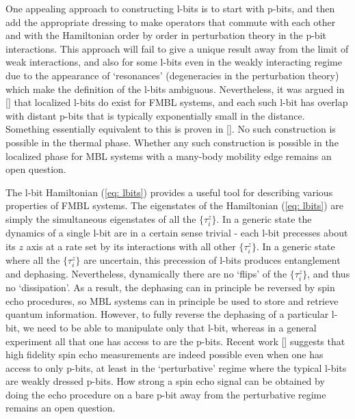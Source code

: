 \documentclass[amsmath,onecolumn, superscriptaddress,preprint,aps]{revtex4}
\renewcommand{\cite}[1]{[\onlinecite{#1}]}
\begin{document}
 One appealing approach to constructing l-bits is to start with p-bits, and then add the appropriate dressing to make operators that commute with each other and
 with the Hamiltonian order by order in perturbation theory in the p-bit interactions.  This approach will fail to give a unique result away from the limit of weak interactions,
 and also for some l-bits even in the weakly interacting regime due to the appearance of `resonances' (degeneracies in the perturbation theory)
 which make the definition of the l-bits ambiguous. Nevertheless, it was argued in \cite{Lbits, Abanin1, Abanin2, Lbits2} that localized l-bits do exist for FMBL systems, and each such l-bit has overlap with distant p-bits that is typically exponentially
 small in the distance.  Something essentially equivalent to this is proven in \cite{IS}.
 No such construction is possible in the thermal phase.  Whether any such construction is possible in the localized phase for MBL systems with a many-body mobility edge
 remains an open question.

    The l-bit Hamiltonian (\ref{eq: lbits}) provides a useful tool for describing various properties of FMBL systems.  The eigenstates of the Hamiltonian (\ref{eq: lbits}) are simply the simultaneous eigenstates of all the $\{\tau^z_i\}$.  In a generic state the dynamics of a single l-bit are in a certain sense trivial - each l-bit precesses about its $z$ axis at a rate set by its interactions with all other $\{\tau^z_i\}$.  In a generic state where all the $\{\tau^z_i\}$ are uncertain, this precession of l-bits produces entanglement and dephasing.
    Nevertheless, dynamically there are no `flips' of the $\{\tau^z_i\}$, and thus no `dissipation'.  As a result, the dephasing can in principle be reversed by spin echo procedures, so MBL systems can in principle be used to store and retrieve quantum information.  However, to fully reverse the dephasing of a particular l-bit, we need to be able to manipulate only that l-bit, whereas in a general experiment all that one has access to are the p-bits.  Recent work \cite{Serbynetal} suggests that high fidelity spin echo measurements are indeed possible even when one has access to only p-bits, at least in the `perturbative' regime where the typical l-bits are weakly dressed p-bits.  How strong a spin echo signal can be obtained by doing the echo procedure on a bare p-bit away from the perturbative regime remains an open question.
\end{document}
